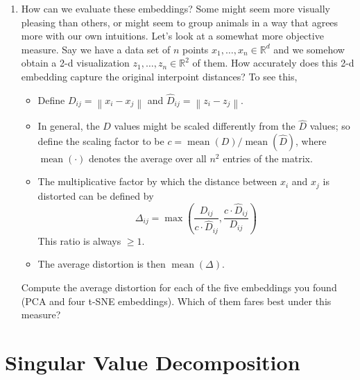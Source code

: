 \documentclass{article}
\begin{document}
\begin{enumerate}
\begin{enumerate}
    \item How can we evaluate these embeddings? Some might seem more visually pleasing than others, or might seem to group animals in a way that agrees more with our own intuitions. Let's look at a somewhat more objective measure. Say we have a data set of $n$ points $x_{1}, \ldots, x_{n} \in \mathbb{R}^{d}$ and we somehow obtain a 2-d visualization $z_{1}, \ldots, z_{n} \in \mathbb{R}^{2}$ of them. How accurately does this 2-d embedding capture the original interpoint distances? To see this,
        \begin{itemize}
        \item Define $D_{i j} = \left\|x_{i} - x_{j}\right\|$ and $\widehat{D}_{i j} = \left\|z_{i} - z_{j}\right\|$.
        \item In general, the $D$ values might be scaled differently from the $\widehat{D}$ values; so define the scaling factor to be $c = \operatorname{mean}(D) / \operatorname{mean}(\widehat{D})$, where $\operatorname{mean}(\cdot)$ denotes the average over all $n^{2}$ entries of the matrix.
        \item The multiplicative factor by which the distance between $x_{i}$ and $x_{j}$ is distorted can be defined by
            \[
            \Delta_{i j} = \max \left(\frac{D_{i j}}{c \cdot \widehat{D}_{i j}}, \frac{c \cdot \widehat{D}_{i j}}{D_{i j}}\right)
            \]
            This ratio is always $\geq 1$.
        \item The average distortion is then $\operatorname{mean}(\Delta)$.
        \end{itemize}
        Compute the average distortion for each of the five embeddings you found (PCA and four t-SNE embeddings). Which of them fares best under this measure?
    \end{enumerate}
\end{enumerate}

\section*{Singular Value Decomposition}
\end{document}
